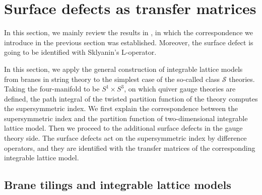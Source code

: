 \begin{comment}
\documentclass[11pt]{article}  %
\usepackage{Common/toshi}

\end{comment}




\newcommand{\fundbox}{\tikz{\node[fnode, semithick, minimum size=8pt] {}}}


\section{Surface defects as transfer matrices}


In this section, we mainly review the results in \cite{Maruyoshi:2016caf},
in which the correspondence we introduce in the previous section was established.
Moreover, the surface defect is going to be identified with Sklyanin's L-operator.




In this section, we apply the general construction of integrable lattice
models from branes in string theory to the simplest case of the so-called
class $\mathcal{S}$ theories. Taking the four-manifold to be $S^{1} \times S^{3}$,
on which quiver gauge theories are defined, the path integral of the
twisted partition function of the theory computes the supersymmetric
index. We first explain the correspondence between the supersymmetric
index and the partition function of two-dimensional integrable lattice
model. Then we proceed to the additional surface defects in the gauge
theory side. The surface defects act on the supersymmetric index by
difference operators, and they are identified with the transfer matrices
of the corresponding integrable lattice model.





\subsection{Brane tilings and integrable lattice models}
\label{sec:tiling_latticemodel}

